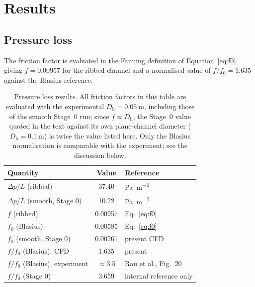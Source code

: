 \documentclass[11pt,a4paper]{article}
\newcommand{\Dh}{D_{\mathrm{h}}}
\begin{document}
\section{Results}

\subsection{Pressure loss}

The friction factor is evaluated in the Fanning definition of
Equation~\eqref{eq:f0}, giving $f = 0.00957$ for the ribbed channel and a
normalised value of $f/f_{0} = 1.635$ against the Blasius reference.

\begin{table}[htbp]
\centering
\caption{Pressure loss results. All friction factors in this table are
evaluated with the experimental $\Dh = \SI{0.05}{\meter}$, including those
of the smooth Stage~0 run; since $f \propto \Dh$, the Stage~0 value quoted
in the text against its own plane-channel diameter
($\Dh = \SI{0.1}{\meter}$) is twice the value listed here. Only the Blasius
normalisation is comparable with the experiment; see the discussion below.}
\label{tab:pressure}
\begin{tabular}{lSl}
\toprule
Quantity & {Value} & Reference \\
\midrule
$\Delta p/L$ (ribbed)   & 37.40   & \si{\pascal\per\meter} \\
$\Delta p/L$ (smooth, Stage 0) & 10.22 & \si{\pascal\per\meter} \\
$f$ (ribbed)            & 0.00957 & Eq.~\eqref{eq:f0} \\
$f_{0}$ (Blasius)       & 0.00585 & Eq.~\eqref{eq:f0} \\
$f_{0}$ (smooth, Stage 0) & 0.00261 & present CFD \\
\midrule
$f/f_{0}$ (Blasius), CFD        & 1.635   & present \\
$f/f_{0}$ (Blasius), experiment & {$\approx 3.5$} & Rau et al., Fig.~20 \\
$f/f_{0}$ (Stage 0)     & 3.659   & internal reference only \\
\bottomrule
\end{tabular}
\end{table}
\end{document}
